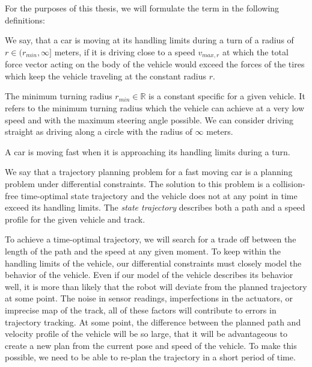 For the purposes of this thesis, we will formulate the term in the following definitions:

\begin{defn}
	We say, that a car is moving at its handling limits during a turn of a radius of $r\in(r_{min}, \infty]$ meters, if it is driving close to a speed $v_{max,r}$ at which the total force vector acting on the body of the vehicle would exceed the forces of the tires which keep the vehicle traveling at the constant radius $r$.
\end{defn}

The minimum turning radius $r_{min}\in\mathbb{R}$ is a constant specific for a given vehicle. It refers to the minimum turning radius which the vehicle can achieve at a very low speed and with the maximum steering angle possible. We can consider driving straight as driving along a circle with the radius of $\infty$ meters.

\begin{defn}\label{def:fast_moving_car}
	A car is moving fast when it is approaching its handling limits during a turn.
\end{defn}

\begin{defn}
	We say that a trajectory planning problem for a fast moving car is a planning problem under differential constraints. The solution to this problem is a collision-free time-optimal state trajectory and the vehicle does not at any point in time exceed its handling limits. The \textit{state trajectory} describes both a path and a speed profile for the given vehicle and track.
\end{defn}


To achieve a time-optimal trajectory, we will search for a trade off between the length of the path and the speed at any given moment. To keep within the handling limits of the vehicle, our differential constraints must closely model the behavior of the vehicle. Even if our model of the vehicle describes its behavior well, it is more than likely that the robot will deviate from the planned trajectory at some point. The noise in sensor readings, imperfections in the actuators, or imprecise map of the track, all of these factors will contribute to errors in trajectory tracking. At some point, the difference between the planned path and velocity profile of the vehicle will be so large, that it will be advantageous to create a new plan from the current pose and speed of the vehicle. To make this possible, we need to be able to re-plan the trajectory in a short period of time.

